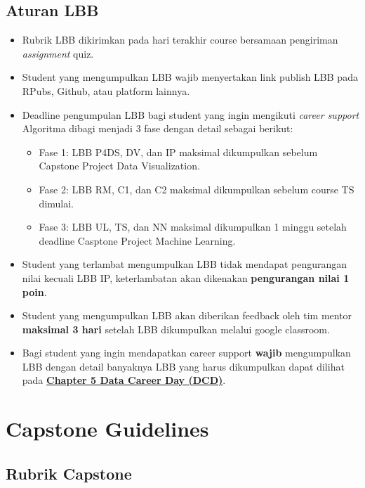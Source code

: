\documentclass[
]{book}
\providecommand{\tightlist}{%
  \setlength{\itemsep}{0pt}\setlength{\parskip}{0pt}}
\begin{document}
\hypertarget{aturan-lbb}{%
\subsection{Aturan LBB}\label{aturan-lbb}}

\begin{itemize}
\item
  Rubrik LBB dikirimkan pada hari terakhir course bersamaan pengiriman \emph{assignment} quiz.
\item
  Student yang mengumpulkan LBB wajib menyertakan link publish LBB pada RPubs, Github, atau platform lainnya.
\item
  Deadline pengumpulan LBB bagi student yang ingin mengikuti \emph{career support} Algoritma dibagi menjadi 3 fase dengan detail sebagai berikut:

  \begin{itemize}
  \tightlist
  \item
    Fase 1: LBB P4DS, DV, dan IP maksimal dikumpulkan sebelum Capstone Project Data Visualization.
  \item
    Fase 2: LBB RM, C1, dan C2 maksimal dikumpulkan sebelum course TS dimulai.
  \item
    Fase 3: LBB UL, TS, dan NN maksimal dikumpulkan 1 minggu setelah deadline Casptone Project Machine Learning.
  \end{itemize}
\item
  Student yang terlambat mengumpulkan LBB tidak mendapat pengurangan nilai kecuali LBB IP, keterlambatan akan dikenakan \textbf{pengurangan nilai 1 poin}.
\item
  Student yang mengumpulkan LBB akan diberikan feedback oleh tim mentor \textbf{maksimal 3 hari} setelah LBB dikumpulkan melalui google classroom.
\item
  Bagi student yang ingin mendapatkan career support \textbf{wajib} mengumpulkan LBB dengan detail banyaknya LBB yang harus dikumpulkan dapat dilihat pada \href{http://127.0.0.1:46600/rmd_output/0/data-career-day-dcd.html\#pre-requisite-data-career-day}{\textbf{Chapter 5 Data Career Day (DCD)}}.
\end{itemize}

\hypertarget{capstone-guidelines}{%
\section{Capstone Guidelines}\label{capstone-guidelines}}

\hypertarget{rubrik-capstone}{%
\subsection{Rubrik Capstone}\label{rubrik-capstone}}
\end{document}
